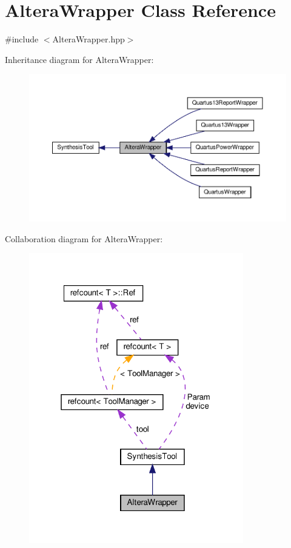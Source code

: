 \hypertarget{classAlteraWrapper}{}\section{Altera\+Wrapper Class Reference}
\label{classAlteraWrapper}


{\ttfamily \#include $<$Altera\+Wrapper.\+hpp$>$}



Inheritance diagram for Altera\+Wrapper\+:
\nopagebreak
\begin{figure}[H]
\begin{center}
\leavevmode
\includegraphics[width=350pt]{d8/ddf/classAlteraWrapper__inherit__graph}
\end{center}
\end{figure}


Collaboration diagram for Altera\+Wrapper\+:
\nopagebreak
\begin{figure}[H]
\begin{center}
\leavevmode
\includegraphics[width=265pt]{d4/ded/classAlteraWrapper__coll__graph}
\end{center}
\end{figure}
